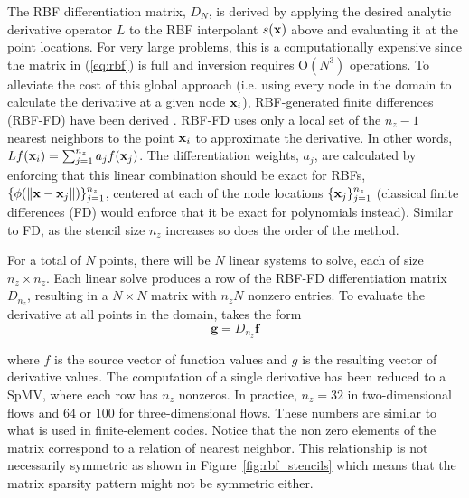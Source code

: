 \documentclass[10pt,conference,compsocconf]{IEEEtran}
\begin{document}
The RBF differentiation matrix, $D_N$, is derived by applying the
desired analytic derivative operator $L$ to the RBF interpolant
$s({\bf x})$ above and evaluating it at the point locations. For very
large problems, this is a computationally expensive since the matrix
in (\ref{eq:rbf}) is full and inversion requires O$(N^3)$
operations. To alleviate the cost of this global approach (i.e. using
every node in the domain to calculate the derivative at a given node
${\bf x}_i$), RBF-generated finite differences (RBF-FD) have been
derived \cite{TAI1,TAI2,SDY02,WrFo06,FoL11,FLBWSC12}. RBF-FD uses only
a local set of the $n_z-1$ nearest neighbors to the point ${\bf x}_i$ to
approximate the derivative. In other words,
$Lf({\bf x}_i)=\sum_{j=1}^{n_z}a_jf({\bf x}_j)$. The differentiation
weights, $a_j$, are calculated by enforcing that this linear
combination should be exact for RBFs,
$\{\phi(\|{\bf x}-{\bf x}_{j}\|)\}_{j=1}^{n_z}$, centered at each of the
node locations $\{{\bf x}_j\}_{j=1}^{n_z}$ (classical finite differences
(FD) would enforce that it be exact for polynomials instead). Similar
to FD, as the stencil size $n_z$ increases so does the order of the
method.

For a total of $N$ points, there will be $N$ linear systems to solve,
each of size $n_z \times n_z$. Each linear solve produces a row of the
RBF-FD differentiation matrix $D_{n_z}$, resulting in a $N \times N$
matrix with $n_zN$ nonzero entries. To evaluate the derivative at all
points in the domain, takes the form
$$
  \mathbf{g} = D_{n_z} \mathbf{f}
$$

where $f$ is the source vector of function values and $g$ is the
resulting vector of derivative values. The computation of a single
derivative has been reduced to a SpMV, where each row has $n_z$
nonzeros. In
practice, $n_z=32$ in two-dimensional flows and 64 or 100 for
three-dimensional flows. These numbers are similar to what is used in
finite-element codes. Notice that the non zero elements of the matrix
correspond to a relation of nearest neighbor. This relationship is not
necessarily symmetric as shown in Figure~\ref{fig:rbf_stencils} which
means that the matrix sparsity pattern might not be symmetric either.
\end{document}

